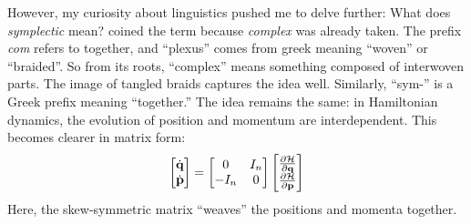     However, my curiosity about linguistics pushed me to delve further: What does \textit{symplectic} mean? \citet{weyl1946classical} coined the term because \textit{complex} was already taken. The prefix \textit{com} refers to together, and ``plexus'' comes from greek meaning ``woven'' or ``braided''. So from its roots, “complex” means something composed of interwoven parts. The image of tangled braids captures the idea well. Similarly, ``sym-'' is a Greek prefix meaning “together.” The idea remains the same: in Hamiltonian dynamics, the evolution of position and momentum are interdependent. This becomes clearer in matrix form:
    \begin{equation}
        \begin{bmatrix}
            \dot{\bf{q}}\\
            \dot{\bf{p}}
        \end{bmatrix}
         = 
        \begin{bmatrix}
            0 & I_n \\
            -I_n & 0 
        \end{bmatrix}
                \begin{bmatrix}
            \frac{\partial \mathcal{H}}{\partial \bf{q}} \\
            \frac{\partial \mathcal{H}}{\partial \bf{p}}
        \end{bmatrix}
        \label{eq:symplectic}
    \end{equation}
    Here, the skew-symmetric matrix “weaves” the positions and momenta together.

